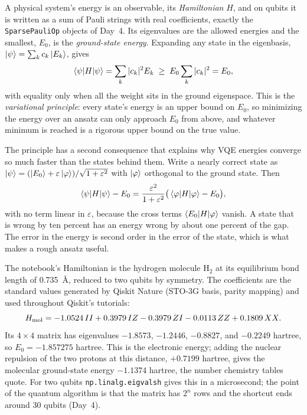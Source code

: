 \documentclass[11pt]{article}
\newcommand{\code}[1]{\texttt{#1}}
\begin{document}
A physical system's energy is an observable, its \emph{Hamiltonian} $H$, and on qubits it is written as a sum of Pauli strings with real coefficients, exactly the \code{SparsePauliOp} objects of Day~4. Its eigenvalues are the allowed energies and the smallest, $E_0$, is the \emph{ground-state energy}. Expanding any state in the eigenbasis, $\ket{\psi} = \sum_k c_k\ket{E_k}$, gives
\begin{equation}
\braket{\psi|H|\psi} = \sum_k |c_k|^2 E_k \;\ge\; E_0 \sum_k |c_k|^2 = E_0 ,
\label{eq:variational}
\end{equation}
with equality only when all the weight sits in the ground eigenspace. This is the \emph{variational principle}: every state's energy is an upper bound on $E_0$, so minimizing the energy over an ansatz can only approach $E_0$ from above, and whatever minimum is reached is a rigorous upper bound on the true value.

The principle has a second consequence that explains why VQE energies converge so much faster than the states behind them. Write a nearly correct state as $\ket{\psi} = (\ket{E_0} + \varepsilon\ket{\varphi})/\sqrt{1+\varepsilon^2}$ with $\ket{\varphi}$ orthogonal to the ground state. Then
\begin{equation}
\braket{\psi|H|\psi} - E_0 = \frac{\varepsilon^2}{1+\varepsilon^2}\big(\braket{\varphi|H|\varphi} - E_0\big),
\label{eq:quadratic}
\end{equation}
with no term linear in $\varepsilon$, because the cross terms $\braket{E_0|H|\varphi}$ vanish. A state that is wrong by ten percent has an energy wrong by about one percent of the gap. The error in the energy is second order in the error of the state, which is what makes a rough ansatz useful.

The notebook's Hamiltonian is the hydrogen molecule $\mathrm{H}_2$ at its equilibrium bond length of 0.735~\AA, reduced to two qubits by symmetry. The coefficients are the standard values generated by Qiskit Nature (STO-3G basis, parity mapping) and used throughout Qiskit's tutorials:
\begin{equation}
H_{\rm mol} = -1.0524\,II + 0.3979\,IZ - 0.3979\,ZI - 0.0113\,ZZ + 0.1809\,XX .
\label{eq:h2}
\end{equation}
Its $4\times4$ matrix has eigenvalues $-1.8573$, $-1.2446$, $-0.8827$, and $-0.2249$ hartree, so $E_0 = -1.857275$ hartree. This is the electronic energy; adding the nuclear repulsion of the two protons at this distance, $+0.7199$ hartree, gives the molecular ground-state energy $-1.1374$ hartree, the number chemistry tables quote. For two qubits \code{np.linalg.eigvalsh} gives this in a microsecond; the point of the quantum algorithm is that the matrix has $2^n$ rows and the shortcut ends around 30 qubits (Day~4).
\end{document}
